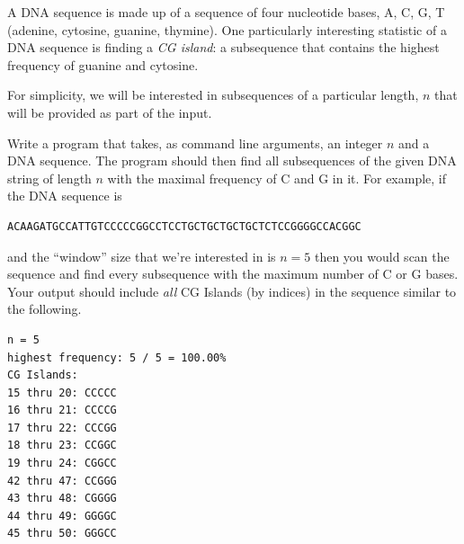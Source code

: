\begin{exer}
A DNA sequence is made up of a sequence of four nucleotide bases, 
A, C, G, T (adenine, cytosine, guanine, thymine).  One particularly interesting 
statistic of a DNA sequence is finding a \emph{CG island}: a subsequence that 
contains the highest frequency of guanine and cytosine.

For simplicity, we will be interested in subsequences of a particular length, $n$ 
that will be provided as part of the input.  

Write a program that takes, as command line arguments, an integer $n$ and
a DNA sequence.  The program should then find all subsequences of the
given DNA string of length $n$ with the maximal frequency of C and G in it.
For example, if the DNA sequence is 

\begin{verbatim}
ACAAGATGCCATTGTCCCCCGGCCTCCTGCTGCTGCTGCTCTCCGGGGCCACGGC
\end{verbatim}

and the ``window'' size that we're interested in is $n = 5$ then you would scan the 
sequence and find every subsequence with the maximum number of C or G bases.  
Your output should include \emph{all} CG Islands (by indices) in the sequence 
similar to the following.

\begin{verbatim}
n = 5
highest frequency: 5 / 5 = 100.00%
CG Islands:
15 thru 20: CCCCC
16 thru 21: CCCCG
17 thru 22: CCCGG
18 thru 23: CCGGC
19 thru 24: CGGCC
42 thru 47: CCGGG
43 thru 48: CGGGG
44 thru 49: GGGGC
45 thru 50: GGGCC
\end{verbatim}
\end{exer}

